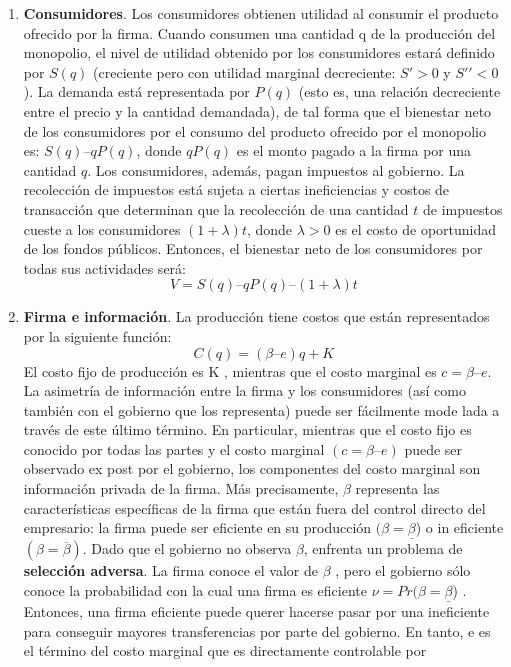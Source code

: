 \documentclass[
  12pt,
  spanish,
]{book}
\begin{document}
\begin{enumerate}
\def\labelenumi{\arabic{enumi}.}
\item
  \textbf{Consumidores}. Los consumidores obtienen utilidad al consumir
  el producto ofrecido por la firma. Cuando consumen una cantidad q de
  la producción del monopolio, el nivel de utilidad obtenido por los
  consumidores estará definido por \(S(q)\) (creciente pero con utilidad
  marginal decreciente: \(S′ > 0\) y \(S′′ < 0\)). La demanda está
  representada por \(P(q)\) (esto es, una relación decreciente entre el
  precio y la cantidad demandada), de tal forma que el bienestar neto de
  los consumidores por el consumo del producto ofrecido por el monopolio
  es: \(S(q) – qP(q)\), donde \(qP(q)\) es el monto pagado a la firma
  por una cantidad \(q\). Los consumidores, además, pagan impuestos al
  gobierno. La recolección de impuestos está sujeta a ciertas
  ineficiencias y costos de transacción que determinan que la
  recolección de una cantidad \(t\) de impuestos cueste a los
  consumidores \((1 + λ)t\), donde \(λ > 0\) es el costo de oportunidad
  de los fondos públicos. Entonces, el bienestar neto de los
  consumidores por todas sus actividades será:
  \[V = S(q) – qP(q) – (1 + λ)t\]
\item
  \textbf{Firma e información}. La producción tiene costos que están
  representados por la siguiente función: \[C(q) = (β – e)q + K\] El
  costo fijo de producción es K , mientras que el costo marginal es
  \(c = β – e\). La asimetría de información entre la firma y los
  consumidores (así como también con el gobierno que los representa)
  puede ser fácilmente mode lada a través de este último término. En
  particular, mientras que el costo fijo es conocido por todas las
  partes y el costo marginal \((c = β – e)\) puede ser observado ex post
  por el gobierno, los componentes del costo marginal son información
  privada de la firma. Más precisamente, \(β\) representa las
  características específicas de la firma que están fuera del control
  directo del empresario: la firma puede ser eficiente en su producción
  \((β = \underline β\)) o in eficiente \((β = \overline{β})\). Dado que
  el gobierno no observa \(β\), enfrenta un problema de
  \textbf{selección adversa}. La firma conoce el valor de \(β\) , pero
  el gobierno sólo conoce la probabilidad con la cual una firma es
  eficiente \(ν = Pr (β = \underline β\)) . Entonces, una firma
  eficiente puede querer hacerse pasar por una ineficiente para
  conseguir mayores transferencias por parte del gobierno. En tanto, e
  es el término del costo marginal que es directamente controlable por

\end{enumerate}
\end{document}
